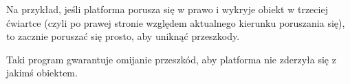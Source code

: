 	Na przykład, jeśli platforma porusza się w prawo i wykryje obiekt w trzeciej ćwiartce (czyli po prawej stronie względem aktualnego kierunku poruszania się),
	to zacznie poruszać się prosto, aby uniknąć przeszkody.
	
	Taki program gwarantuje omijanie przeszkód, aby platforma nie zderzyła się z jakimś obiektem.
